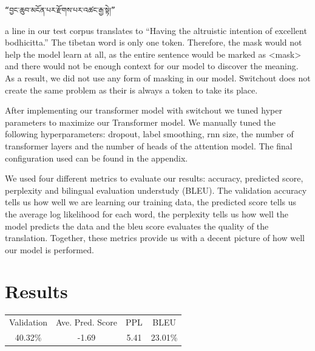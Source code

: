 \documentclass[letterpaper, 10 pt, conference]{ieeeconf}  %
\begin{document}
\begin{verbatim}
“བྱང་ཆུབ་མངོན་པར་རྫོགས་པར་འཚང་རྒྱ་སྟེ།” 
\end{verbatim}
a line in our test corpus translates to “Having the altruistic intention of excellent bodhicitta.” The tibetan word is only one token. Therefore, the mask would not help the model learn at all, as the entire sentence would be marked as <mask> and there would not be enough context for our model to discover the meaning. As a result, we did not use any form of masking in our model. Switchout does not create the same problem as their is always a token to take its place. \par
After implementing our transformer model with switchout we tuned hyper parameters to maximize our Transformer model. We manually tuned the following hyperparameters: dropout, label smoothing, rnn size, the number of transformer layers and the number of heads of the attention model. The final configuration used can be found in the appendix. \par
We used four different metrics to evaluate our results: accuracy, predicted score, perplexity and bilingual evaluation understudy (BLEU). The validation accuracy tells us how well we are learning our training data, the predicted score tells us the average log likelihood for each word, the perplexity tells us how well the model predicts the data and the bleu score evaluates the quality of the translation. Together, these metrics provide us with a decent picture of how well our model is performed. 

\section{Results}
\begin{tabular}{ |c| c| c| c| }
 Validation & Ave. Pred. Score & PPL & BLEU \\ 
 40.32\% & -1.69 & 5.41 & 23.01\% \\

\end{tabular}\\
\end{document}
